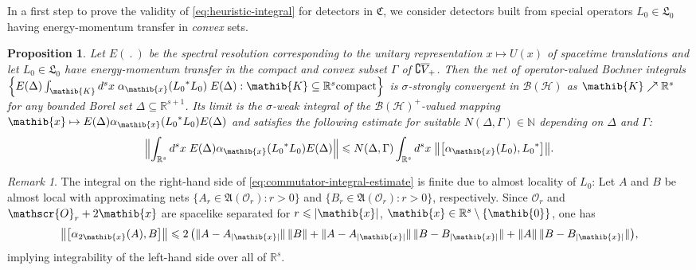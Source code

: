 \documentclass[a4paper,a4paper]{article}
\numberwithin{equation}{section}
\newcommand{\Nbb}{\mathbb{N}}
\newcommand{\Cfrak}{\mathfrak{C}}
\newcommand{\Lfrak}{\mathfrak{L}}
\newcommand{\zeroib}{\mathib{0}}
\newcommand{\Kib}{\mathib{K}}
\newcommand{\xib}{\mathib{x}}
\newcommand{\Oscr}{\mathscr{O}}
\newcommand{\Rs}{\mathbb{R}^s}
\newcommand{\Rsone}{\mathbb{R}^{s + 1}}
\newcommand{\BH}{\mathscr{B} ( \mathscr{H} )}
\newcommand{\fwcone}{\overline{V}_{\negthinspace +}}
\newcommand{\ED}{E ( \Delta )}
\newcommand{\aibx}{\alpha_\mathib{x}}
\newcommand{\aibtwox}{\alpha_{2\mathib{x}}}
\newcommand{\AOr}{\mathfrak{A} ( \mathscr{O}_r )}
\theoremstyle{definition}
\theoremstyle{plain}
\newtheorem{proposition}[definition]{Proposition}
\theoremstyle{remark}
\newtheorem*{remark*}{Remark}
\newcommand{\set}[1]{\{ #1 \}}
\newcommand{\bset}[1]{\bigl\{ #1 \bigr\}}
\newcommand{\Bset}[1]{\Bigl\{ #1 \Bigr\}}
\newcommand{\bcomm}[2]{\bigl[ #1 , #2 \bigr]}
\newcommand{\abs}[1]{\lvert #1 \rvert}
\newcommand{\norm}[1]{\lVert #1 \rVert}
\newcommand{\bnorm}[1]{\bigl\lVert #1 \bigr\rVert}
\newcommand{\Bnorm}[1]{\Bigl\lVert #1 \Bigr\rVert}
\begin{document}
  In a first step to prove the validity of
  \eqref{eq:heuristic-integral} for detectors in $\Cfrak$, we consider
  detectors built from special operators $L_0 \in \Lfrak_0$ having
  energy-momentum transfer in \emph{convex} sets.
  \begin{proposition}
    \label{pro:harmonic-analysis}
    Let $E (~.~)$ be the spectral resolution corresponding to the
    unitary representation $x \mapsto U ( x )$ of spacetime
    translations and let $L_0 \in \Lfrak_0$ have energy-momentum
    transfer in the compact and convex subset $\Gamma$ of $\complement
    \fwcone$. Then the net of operator-valued Bochner integrals
    $\Bset{\ED \int_\Kib d^s x \; \aibx ( {L_0}^* L_0 ) \; \ED : \Kib
    \subseteq \Rs \text{compact}}$ is $\sigma$-strongly convergent
    in $\BH$ as $\Kib \nearrow \Rs$ for any bounded Borel set $\Delta
    \subseteq \Rsone$. Its limit is the $\sigma$-weak integral of the
    $\BH^+$-valued mapping $\xib \mapsto \ED \aibx ( {L_0}^* L_0 )
    \ED$ and satisfies the following estimate for suitable $N ( \Delta
    , \Gamma ) \in \Nbb$ depending on $\Delta$ and $\Gamma$:
    \begin{equation}
      \label{eq:commutator-integral-estimate}
      \Bnorm{\int_{\Rs} d^s x \; \ED \aibx ( {L_0}^* L_0 ) \ED}
      \leqslant N ( \Delta , \Gamma ) \int_{\Rs} d^s x \;
      \bnorm{\bcomm{\aibx ( L_0 )}{{L_0}^*}} \text{.}
    \end{equation}
  \end{proposition}
  \begin{remark*}
    The integral on the right-hand side of
    \eqref{eq:commutator-integral-estimate} is finite due to almost
    locality of $L_0$: Let $A$ and $B$ be almost local with
    approximating nets $\bset{A_r \in \AOr : r > 0}$ and $\bset{B_r
    \in \AOr : r > 0}$, respectively. Since $\Oscr_r$ and $\Oscr_r +
    2 \xib$ are spacelike separated for $r \leqslant \abs{\xib}$,
    $\xib \in \Rs \setminus \set{\zeroib}$, one has
    \begin{equation}
      \label{eq:commutator-norm-estimate}
      \bnorm{\bcomm{\aibtwox ( A )}{B}} \leqslant 2 \, \bigl(
      \norm{A - A_{\abs{\xib}}} \, \norm{B} + \norm{A -
      A_{\abs{\xib}}} \, \norm{B - B_{\abs{\xib}}} + \norm{A} \,
      \norm{B - B_{\abs{\xib}}} \bigr) \text{,}
    \end{equation}
    implying integrability of the left-hand side over all of $\Rs$.
  \end{remark*}
\end{document}
